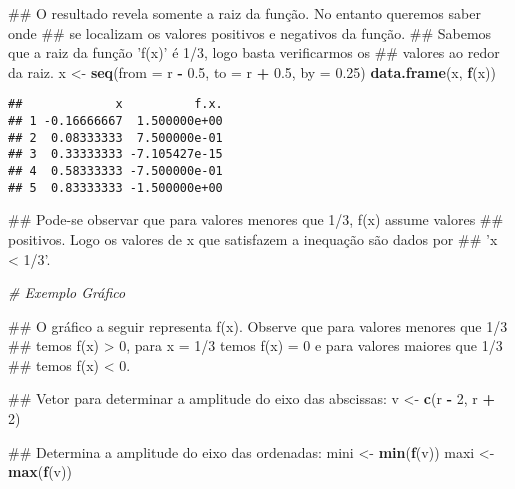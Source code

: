 \documentclass[]{book}
\newenvironment{Shaded}{\begin{snugshade}}{\end{snugshade}}
\newcommand{\KeywordTok}[1]{\textcolor[rgb]{0.13,0.29,0.53}{\textbf{#1}}}
\newcommand{\DataTypeTok}[1]{\textcolor[rgb]{0.13,0.29,0.53}{#1}}
\newcommand{\DecValTok}[1]{\textcolor[rgb]{0.00,0.00,0.81}{#1}}
\newcommand{\FloatTok}[1]{\textcolor[rgb]{0.00,0.00,0.81}{#1}}
\newcommand{\StringTok}[1]{\textcolor[rgb]{0.31,0.60,0.02}{#1}}
\newcommand{\CommentTok}[1]{\textcolor[rgb]{0.56,0.35,0.01}{\textit{#1}}}
\newcommand{\OperatorTok}[1]{\textcolor[rgb]{0.81,0.36,0.00}{\textbf{#1}}}
\newcommand{\NormalTok}[1]{#1}
\begin{document}
\begin{enumerate}
\begin{Shaded}
\begin{Highlighting}[]
\NormalTok{##  O resultado revela somente a raiz da função. No entanto queremos saber onde}
\NormalTok{## se localizam os valores positivos e negativos da função.}
\NormalTok{##  Sabemos que a raiz da função 'f(x)' é 1/3, logo basta verificarmos os}
\NormalTok{## valores ao redor da raiz.}
\NormalTok{x <-}\StringTok{ }\KeywordTok{seq}\NormalTok{(}\DataTypeTok{from =}\NormalTok{ r }\OperatorTok{-}\StringTok{ }\FloatTok{0.5}\NormalTok{, }\DataTypeTok{to =}\NormalTok{ r }\OperatorTok{+}\StringTok{ }\FloatTok{0.5}\NormalTok{, }\DataTypeTok{by =} \FloatTok{0.25}\NormalTok{)}
\KeywordTok{data.frame}\NormalTok{(x, }\KeywordTok{f}\NormalTok{(x))}
\end{Highlighting}
\end{Shaded}

\begin{verbatim}
##             x          f.x.
## 1 -0.16666667  1.500000e+00
## 2  0.08333333  7.500000e-01
## 3  0.33333333 -7.105427e-15
## 4  0.58333333 -7.500000e-01
## 5  0.83333333 -1.500000e+00
\end{verbatim}

\begin{Shaded}
\begin{Highlighting}[]
\NormalTok{##  Pode-se observar que para valores menores que 1/3, f(x) assume valores}
\NormalTok{## positivos. Logo os valores de x que satisfazem a inequação são dados por}
\NormalTok{## 'x < 1/3'.}

\CommentTok{# Exemplo Gráfico}

\NormalTok{##  O gráfico a seguir representa f(x). Observe que para valores menores que 1/3}
\NormalTok{## temos f(x) > 0, para x = 1/3 temos f(x) = 0 e para valores maiores que 1/3}
\NormalTok{## temos f(x) < 0.}

\NormalTok{##  Vetor para determinar a amplitude do eixo das abscissas:}
\NormalTok{v <-}\StringTok{ }\KeywordTok{c}\NormalTok{(r }\OperatorTok{-}\StringTok{ }\DecValTok{2}\NormalTok{, r }\OperatorTok{+}\StringTok{ }\DecValTok{2}\NormalTok{)}

\NormalTok{##  Determina  a amplitude do eixo das ordenadas:}
\NormalTok{mini <-}\StringTok{ }\KeywordTok{min}\NormalTok{(}\KeywordTok{f}\NormalTok{(v))}
\NormalTok{maxi <-}\StringTok{ }\KeywordTok{max}\NormalTok{(}\KeywordTok{f}\NormalTok{(v))}


\end{Highlighting}
\end{Shaded}
\end{enumerate}
\end{document}
